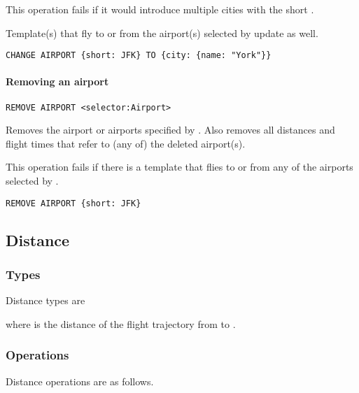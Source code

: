This operation fails if it would introduce multiple cities with the short
.

Template(s) that fly to or from the airport(s) selected by  update
as well.

\begin{texa}
  \lstinline|CHANGE AIRPORT {short: JFK} TO {city: {name: "York"}}|
\end{texa}


\paragraph{Removing an airport}
\begin{operation}
  \lstinline{REMOVE AIRPORT <selector:Airport>}
  \label{op:remove_airport}
\end{operation}
Removes the airport or airports specified by . Also removes all
distances and flight times that refer to (any of) the deleted airport(s).

This operation fails if there is a template that flies to or from any of the
airports selected by .

\begin{texa}
  \lstinline|REMOVE AIRPORT {short: JFK}|
\end{texa}


\subsection{Distance}
\subsubsection{Types}
Distance types are
\begin{description}
  \item[] 
  \item[] 
\end{description}
where  is the distance of the flight trajectory from  to
.
\subsubsection{Operations}
Distance operations are as follows.

